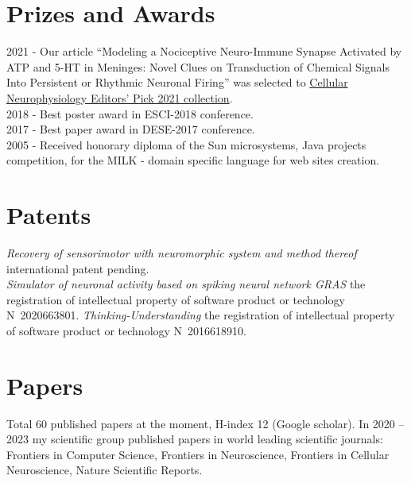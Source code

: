 \documentclass{moderncv}
\begin{document}
    \cvitem{ }{ }
    
    \section{Prizes and Awards}
    
    2021 - Our article ``Modeling a Nociceptive Neuro-Immune Synapse Activated by ATP and 5-HT in Meninges: Novel Clues on Transduction of Chemical Signals Into Persistent or Rhythmic Neuronal Firing'' was selected to \href{https://www.frontiersin.org/research-topics/21434/cellular-neurophysiology-editors-pick-2021}{Cellular Neurophysiology Editors' Pick 2021 collection}.\\
    2018 - Best poster award in ESCI-2018 conference.\\
    2017 - Best paper award in DESE-2017 conference.\\
    2005 - Received honorary diploma of the Sun microsystems, Java projects competition, for the MILK - domain specific language for web sites creation.

    \section{Patents}
    
    \emph{Recovery of sensorimotor with neuromorphic system and method thereof} international patent pending.\\
    \emph{Simulator of neuronal activity based on spiking neural network GRAS} the registration of intellectual property of software product or technology N~2020663801.
    \emph{Thinking-Understanding} the registration of intellectual property of software product or technology N~2016618910.\\
    
    \section{Papers}
    
    Total 60 published papers at the moment, H-index 12 (Google scholar).
    In 2020 -- 2023 my scientific group published papers in world leading scientific journals:
    Frontiers in Computer Science, Frontiers in Neuroscience, Frontiers in Cellular Neuroscience, Nature Scientific Reports.
\end{document}
